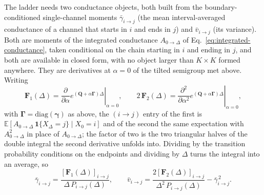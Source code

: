 The ladder needs two conductance objects, both built from the boundary-conditioned
single-channel moments $\bar{\gamma}_{i\to j}$ (the mean interval-averaged
conductance of a channel that starts in $i$ and ends in $j$) and
$\bar{v}_{i\to j}$ (its variance). Both are moments of the integrated conductance
$A_{0\to\Delta}$ of Eq.~\ref{eq:integrated-conductance}, taken conditional on the chain starting
in $i$ and ending in $j$, and both are available in closed form, with no object larger
than $K\times K$ formed anywhere. They are derivatives at $\alpha=0$ of the tilted semigroup
met above. Writing
\begin{equation}
  \mathbf{F}_1(\Delta)=\left.\frac{\partial}{\partial\alpha}
      e^{(\mathbf{Q}+\alpha\bm{\Gamma})\Delta}\right|_{\alpha=0},
  \qquad
  2\,\mathbf{F}_2(\Delta)=\left.\frac{\partial^{2}}{\partial\alpha^{2}}
      e^{(\mathbf{Q}+\alpha\bm{\Gamma})\Delta}\right|_{\alpha=0},
  \label{eq:tilted-derivatives}
\end{equation}
with $\bm{\Gamma}=\mathrm{diag}(\bm{\gamma})$ as above, the $(i\to j)$ entry of the first is
$\mathbb{E}[A_{0\to\Delta}\,\mathbf{1}\{X_\Delta=j\}\mid X_0=i]$ and of the second the same
expectation with $A^2_{0\to\Delta}$ in place of $A_{0\to\Delta}$; the factor of two is the two
triangular halves of the double integral the second derivative unfolds into. Dividing by the
transition probability conditions on the endpoints and dividing by $\Delta$ turns the
integral into an average, so
\begin{equation}
  \bar{\gamma}_{i\to j}
    = \frac{[\mathbf{F}_1(\Delta)]_{i\to j}}{\Delta\,P_{i\to j}(\Delta)},
  \qquad
  \bar{v}_{i\to j}
    = \frac{2[\mathbf{F}_2(\Delta)]_{i\to j}}{\Delta^2\,P_{i\to j}(\Delta)}
      - \bar{\gamma}^{\,2}_{i\to j}.
  \label{eq:gammabar-vbar}
\end{equation}

